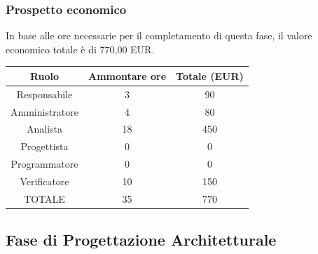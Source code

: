 \subsubsection{Prospetto economico}
In base alle ore necessarie per il completamento di questa fase, il valore economico totale è di 770,00 EUR.
\begin{center}
\begin{tabular}{ |c|c|c|  }
 \hline
 Ruolo 		& Ammontare ore 	& Totale (EUR)\\
 	\hline
 \hline
 	Responsabile	& 3 		& 90\\
	Amministratore	& 4		& 80\\
	Analista		& 18 	& 450\\
	Progettista		& 0		& 0\\
	Programmatore	& 0		& 0\\
	Verificatore	& 10		& 150\\
 \hline\hline
 TOTALE		& 35		& 770\\
  \hline
\end{tabular}
\end{center}
\newpage
\subsection{Fase di Progettazione Architetturale}
